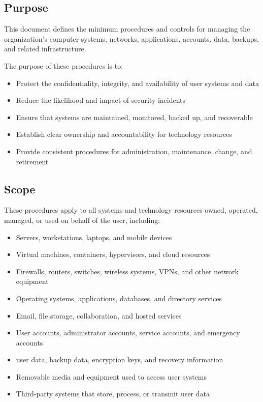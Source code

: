 \subsection{Purpose}

This document defines the minimum procedures and controls for managing the organization's computer systems, networks, applications, accounts, data, backups, and related infrastructure.

The purpose of these procedures is to:
\begin{itemize}
    \item Protect the confidentiality, integrity, and availability of user systems and data
    \item Reduce the likelihood and impact of security incidents
    \item Ensure that systems are maintained, monitored, backed up, and recoverable
    \item Establish clear ownership and accountability for technology resources
    \item Provide consistent procedures for administration, maintenance, change, and retirement
\end{itemize}

\subsection{Scope}

These procedures apply to all systems and technology resources owned, operated, managed, or used on behalf of the user, including:

\begin{itemize}
    \item Servers, workstations, laptops, and mobile devices
    \item Virtual machines, containers, hypervisors, and cloud resources
    \item Firewalls, routers, switches, wireless systems, VPNs, and other network equipment
    \item Operating systems, applications, databases, and directory services
    \item Email, file storage, collaboration, and hosted services
    \item User accounts, administrator accounts, service accounts, and emergency accounts
    \item user data, backup data, encryption keys, and recovery information
    \item Removable media and equipment used to access user systems
    \item Third-party systems that store, process, or transmit user data
\end{itemize}

